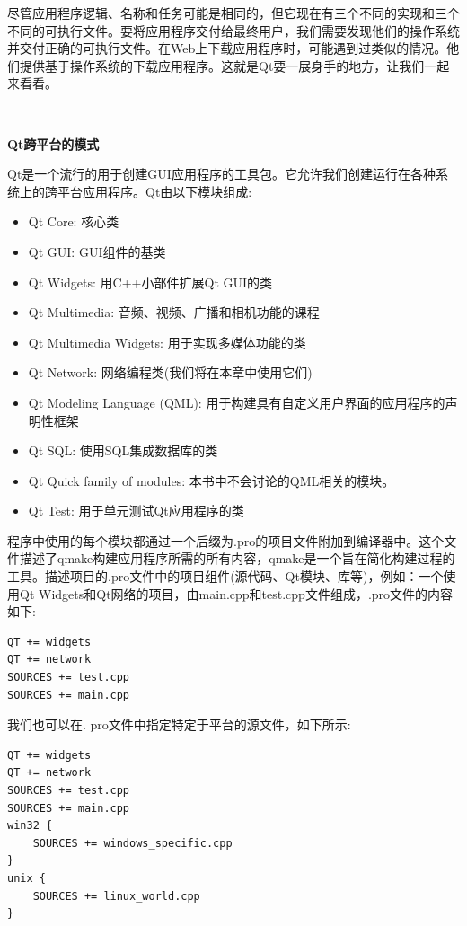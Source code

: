 尽管应用程序逻辑、名称和任务可能是相同的，但它现在有三个不同的实现和三个不同的可执行文件。要将应用程序交付给最终用户，我们需要发现他们的操作系统并交付正确的可执行文件。在Web上下载应用程序时，可能遇到过类似的情况。他们提供基于操作系统的下载应用程序。这就是Qt要一展身手的地方，让我们一起来看看。 \par

\noindent\textbf{}\ \par
\textbf{Qt跨平台的模式} \ \par
Qt是一个流行的用于创建GUI应用程序的工具包。它允许我们创建运行在各种系统上的跨平台应用程序。Qt由以下模块组成: \par

\begin{itemize}
	\item Qt Core: 核心类
	\item Qt GUI: GUI组件的基类
	\item Qt Widgets: 用C++小部件扩展Qt GUI的类
	\item Qt Multimedia: 音频、视频、广播和相机功能的课程
	\item Qt Multimedia Widgets: 用于实现多媒体功能的类
	\item Qt Network: 网络编程类(我们将在本章中使用它们)
	\item Qt Modeling Language (QML): 用于构建具有自定义用户界面的应用程序的声明性框架
	\item Qt SQL: 使用SQL集成数据库的类
	\item Qt Quick family of modules: 本书中不会讨论的QML相关的模块。
	\item Qt Test: 用于单元测试Qt应用程序的类
\end{itemize}

程序中使用的每个模块都通过一个后缀为.pro的项目文件附加到编译器中。这个文件描述了qmake构建应用程序所需的所有内容，qmake是一个旨在简化构建过程的工具。描述项目的.pro文件中的项目组件(源代码、Qt模块、库等)，例如：一个使用Qt Widgets和Qt网络的项目，由main.cpp和test.cpp文件组成，.pro文件的内容如下: \par

\begin{lstlisting}[caption={}]
QT += widgets
QT += network
SOURCES += test.cpp
SOURCES += main.cpp
\end{lstlisting}

我们也可以在. pro文件中指定特定于平台的源文件，如下所示: \par

\begin{lstlisting}[caption={}]
QT += widgets
QT += network
SOURCES += test.cpp
SOURCES += main.cpp
win32 {
	SOURCES += windows_specific.cpp
}
unix {
	SOURCES += linux_world.cpp
}
\end{lstlisting}

